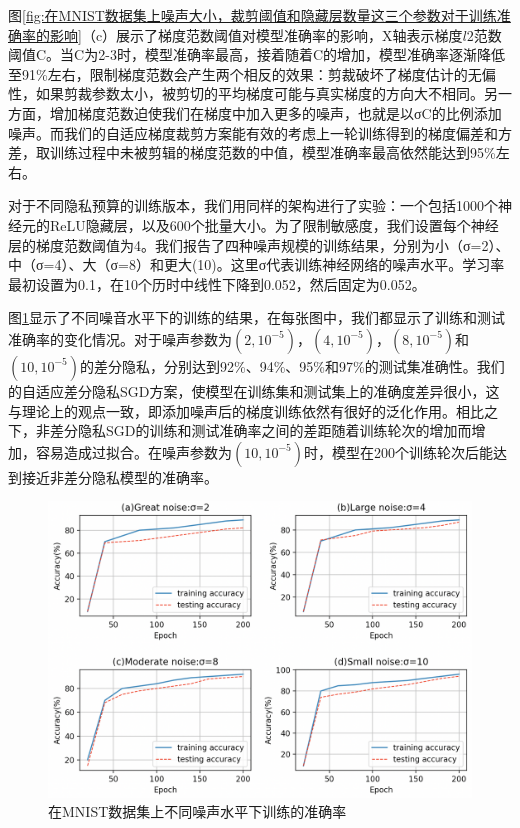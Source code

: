 图\ref{fig:在MNIST数据集上噪声大小，裁剪阈值和隐藏层数量这三个参数对于训练准确率的影响}（c）展示了梯度范数阈值对模型准确率的影响，X轴表示梯度$l2$范数阈值C。当C为2-3时，模型准确率最高，接着随着C的增加，模型准确率逐渐降低至91\%左右，限制梯度范数会产生两个相反的效果：剪裁破坏了梯度估计的无偏性，如果剪裁参数太小，被剪切的平均梯度可能与真实梯度的方向大不相同。另一方面，增加梯度范数迫使我们在梯度中加入更多的噪声，也就是以σC的比例添加噪声。而我们的自适应梯度裁剪方案能有效的考虑上一轮训练得到的梯度偏差和方差，取训练过程中未被剪辑的梯度范数的中值，模型准确率最高依然能达到95\%左右。

对于不同隐私预算的训练版本，我们用同样的架构进行了实验：一个包括1000个神经元的ReLU隐藏层，以及600个批量大小。为了限制敏感度，我们设置每个神经层的梯度范数阈值为4。我们报告了四种噪声规模的训练结果，分别为小（σ=2）、中（σ=4）、大（σ=8）和更大(10)。这里σ代表训练神经网络的噪声水平。学习率最初设置为0.1，在10个历时中线性下降到0.052，然后固定为0.052。

图\ref{fig:在MNIST数据集上不同噪声水平下训练的准确率}显示了不同噪音水平下的训练的结果，在每张图中，我们都显示了训练和测试准确率的变化情况。对于噪声参数为$\left(2,10^{-5}\right)$，$\left(4,10^{-5}\right)$，$\left(8,10^{-5}\right)$和$\left(10,10^{-5}\right)$的差分隐私，分别达到92\%、94\%、95\%和97\%的测试集准确性。我们的自适应差分隐私SGD方案，使模型在训练集和测试集上的准确度差异很小，这与理论上的观点一致，即添加噪声后的梯度训练依然有很好的泛化作用。相比之下，非差分隐私SGD的训练和测试准确率之间的差距随着训练轮次的增加而增加，容易造成过拟合。在噪声参数为$\left(10,10^{-5}\right)$时，模型在200个训练轮次后能达到接近非差分隐私模型的准确率。

\begin{figure}[!hbt]
\centering
	\includegraphics[scale=0.35]{fig2/C3/第三章实验一2}%
	\caption{在MNIST数据集上不同噪声水平下训练的准确率}
	\label{fig:在MNIST数据集上不同噪声水平下训练的准确率}	
\end{figure}

